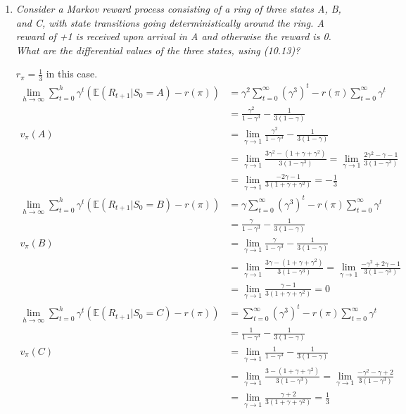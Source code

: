 \documentclass[12pt,a4paper]{article}
\begin{document}
\begin{enumerate}
  \item \textit{Consider a Markov reward process consisting of a ring of three states A, B,
  and C, with state transitions going deterministically around the ring. A reward of +1 is
  received upon arrival in A and otherwise the reward is 0. What are the differential values
  of the three states, using (10.13)?}

  $r_\pi = \frac{1}{3}$ in this case.
  \begin{align*}
    \lim\limits_{h \rightarrow \infty}
    \sum\limits_{t = 0}^h \gamma^t(\mathbb{E}(R_{t + 1} | S_0 = A) - r(\pi))
    &= \gamma^2 \sum\limits_{t = 0}^\infty (\gamma^3)^t - r(\pi)
    \sum\limits_{t = 0}^\infty \gamma^t\\
    &= \frac{\gamma^2}{1 - \gamma^3} - \frac{1}{3(1 - \gamma)}\\
    v_\pi(A) &= \lim\limits_{\gamma \rightarrow 1}
    \frac{\gamma^2}{1 - \gamma^3} - \frac{1}{3(1 - \gamma)}\\
    &= \lim\limits_{\gamma \rightarrow 1}
    \frac{3 \gamma^2 - (1 + \gamma + \gamma^2)}{3(1 - \gamma^3)}
    = \lim\limits_{\gamma \rightarrow 1}
    \frac{2\gamma^2 - \gamma - 1}{3(1 - \gamma^3)}\\
    &= \lim\limits_{\gamma \rightarrow 1} \frac{-2 \gamma - 1}{3(1 + \gamma + \gamma^2)}
    = -\frac{1}{3}\\
    \lim\limits_{h \rightarrow \infty}
    \sum\limits_{t = 0}^h \gamma^t(\mathbb{E}(R_{t + 1} | S_0 = B) - r(\pi))
    &= \gamma \sum\limits_{t = 0}^\infty (\gamma^3)^t - r(\pi)
    \sum\limits_{t = 0}^\infty \gamma^t\\
    &= \frac{\gamma}{1 - \gamma^3} - \frac{1}{3(1 - \gamma)}\\
    v_\pi(B) &= \lim\limits_{\gamma \rightarrow 1}
    \frac{\gamma}{1 - \gamma^3} - \frac{1}{3(1 - \gamma)}\\
    &= \lim\limits_{\gamma \rightarrow 1}
    \frac{3 \gamma - (1 + \gamma + \gamma^2)}{3(1 - \gamma^3)}
    = \lim\limits_{\gamma \rightarrow 1}
    \frac{-\gamma^2 + 2 \gamma - 1}{3(1 - \gamma^3)}\\
    &= \lim\limits_{\gamma \rightarrow 1} \frac{\gamma - 1}{3(1 + \gamma + \gamma^2)}
    = 0\\
    \lim\limits_{h \rightarrow \infty}
    \sum\limits_{t = 0}^h \gamma^t(\mathbb{E}(R_{t + 1} | S_0 = C) - r(\pi))
    &= \sum\limits_{t = 0}^\infty (\gamma^3)^t - r(\pi)
    \sum\limits_{t = 0}^\infty \gamma^t\\
    &= \frac{1}{1 - \gamma^3} - \frac{1}{3(1 - \gamma)}\\
    v_\pi(C) &= \lim\limits_{\gamma \rightarrow 1}
    \frac{1}{1 - \gamma^3} - \frac{1}{3(1 - \gamma)}\\
    &= \lim\limits_{\gamma \rightarrow 1}
    \frac{3 - (1 + \gamma + \gamma^2)}{3(1 - \gamma^3)}
    = \lim\limits_{\gamma \rightarrow 1}
    \frac{-\gamma^2 - \gamma  + 2}{3(1 - \gamma^3)}\\
    &= \lim\limits_{\gamma \rightarrow 1} \frac{\gamma + 2}{3(1 + \gamma + \gamma^2)}
    = \frac{1}{3}\\
  \end{align*}


\end{enumerate}
\end{document}
